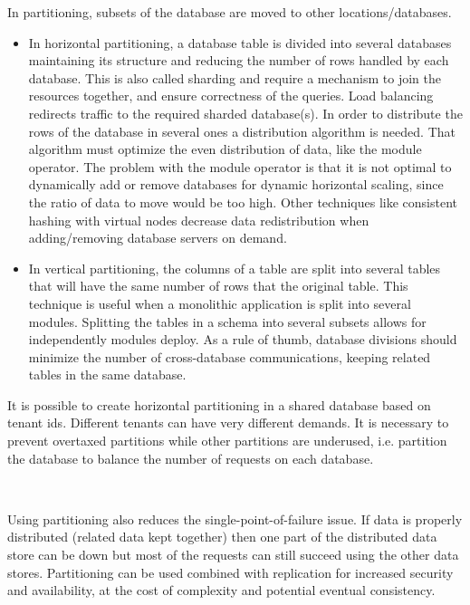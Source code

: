 \documentclass[12pt,english]{article} %
\begin{document}
In partitioning, subsets of the database are moved to other locations/databases.
\begin{itemize}
    \item In horizontal partitioning, a database table is divided into several databases maintaining its structure and reducing the number of rows handled by each database.
    This is also called sharding and require a mechanism to join the resources together, and ensure correctness of the queries.
    Load balancing redirects traffic to the required sharded database(s).
    In order to distribute the rows of the database in several ones a distribution algorithm is needed.
    That algorithm must optimize the even distribution of data, like the module operator.
    The problem with the module operator is that it is not optimal to dynamically add or remove databases for dynamic horizontal scaling, since the ratio of data to move would be too high.
    Other techniques like consistent hashing with virtual nodes decrease data redistribution when adding/removing database servers on demand.
    \item In vertical partitioning, the columns of a table are split into several tables that will have the same number of rows that the original table.
    This technique is useful when a monolithic application is split into several modules.
    Splitting the tables in a schema into several subsets allows for independently modules deploy.
    As a rule of thumb, database divisions should minimize the number of cross-database communications, keeping related tables in the same database.
\end{itemize}

It is possible to create horizontal partitioning in a shared database based on tenant ids.
Different tenants can have very different demands.
It is necessary to prevent overtaxed partitions while other partitions are underused, i.e. partition the database to balance the number of requests on each database.

\

Using partitioning also reduces the single-point-of-failure issue.
If data is properly distributed (related data kept together) then one part of the distributed data store can be down but most of the requests can still succeed using the other data stores.
Partitioning can be used combined with replication for increased security and availability, at the cost of complexity and potential eventual consistency.
\end{document}
